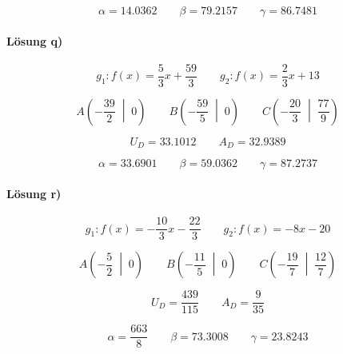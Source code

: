 \begin{equation*}
  \alpha=\num{14.0362}
  \qquad
  \beta=\num{79.2157}
  \qquad
  \gamma=\num{86.7481}
\end{equation*}

\paragraph{Lösung q)}
\begin{equation*}
  g_1:f(x)=\frac{\num{5}}{\num{3}}x+\frac{\num{59}}{\num{3}}
  \qquad
  g_2:f(x)=\frac{\num{2}}{\num{3}}x+\num{13}
\end{equation*}

\begin{equation*}
  A\left(-\frac{\num{39}}{\num{2}}\;\middle|\;\num{0}\right)
  \qquad
  B\left(-\frac{\num{59}}{\num{5}}\;\middle|\;\num{0}\right)
  \qquad
  C\left(-\frac{\num{20}}{\num{3}}\;\middle|\;\frac{\num{77}}{\num{9}}\right)
\end{equation*}

\begin{equation*}
  U_D=\num{33.1012}
  \qquad
  A_D=\num{32.9389}
\end{equation*}

\begin{equation*}
  \alpha=\num{33.6901}
  \qquad
  \beta=\num{59.0362}
  \qquad
  \gamma=\num{87.2737}
\end{equation*}

\paragraph{Lösung r)}
\begin{equation*}
  g_1:f(x)=-\frac{\num{10}}{\num{3}}x-\frac{\num{22}}{\num{3}}
  \qquad
  g_2:f(x)=-\num{8}x-\num{20}
\end{equation*}

\begin{equation*}
  A\left(-\frac{\num{5}}{\num{2}}\;\middle|\;\num{0}\right)
  \qquad
  B\left(-\frac{\num{11}}{\num{5}}\;\middle|\;\num{0}\right)
  \qquad
  C\left(-\frac{\num{19}}{\num{7}}\;\middle|\;\frac{\num{12}}{\num{7}}\right)
\end{equation*}

\begin{equation*}
  U_D=\frac{\num{439}}{\num{115}}
  \qquad
  A_D=\frac{\num{9}}{\num{35}}
\end{equation*}

\begin{equation*}
  \alpha=\frac{\num{663}}{\num{8}}
  \qquad
  \beta=\num{73.3008}
  \qquad
  \gamma=\num{23.8243}
\end{equation*}

